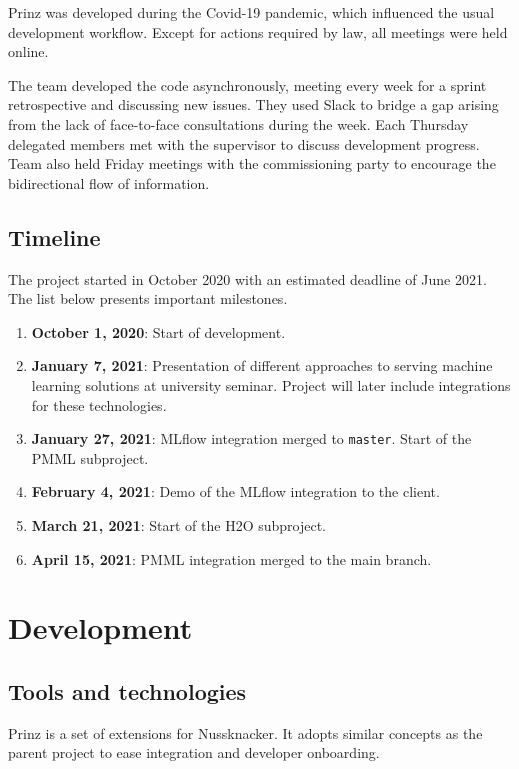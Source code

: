 Prinz was developed during the Covid-19 pandemic, which influenced the usual development workflow.
Except for actions required by law, all meetings were held online.

The team developed the code asynchronously, meeting every week for a sprint retrospective and discussing new issues.
They used Slack to bridge a gap arising from the lack of face-to-face consultations during the week.
Each Thursday delegated members met with the supervisor to discuss development progress.
Team also held Friday meetings with the commissioning party to encourage the bidirectional flow of information.

\subsection{Timeline}

The project started in October 2020 with an estimated deadline of June 2021.
The list below presents important milestones.
\begin{enumerate}
  \item \textbf{October 1, 2020}: Start of development.
  \item \textbf{January 7, 2021}: Presentation of different approaches to serving machine learning solutions at university seminar. Project will later include integrations for these technologies.
  \item \textbf{January 27, 2021}: MLflow integration merged to \texttt{master}. Start of the PMML subproject.
  \item \textbf{February 4, 2021}: Demo of the MLflow integration to the client.
  \item \textbf{March 21, 2021}: Start of the H2O subproject.
  \item \textbf{April 15, 2021}: PMML integration merged to the main branch.
\end{enumerate}

\section{Development}

\subsection{Tools and technologies}

Prinz is a set of extensions for Nussknacker.
It adopts similar concepts as the parent project to ease integration and developer onboarding.

